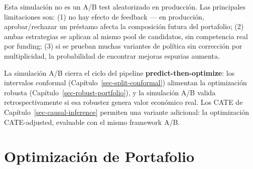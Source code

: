 \documentclass[
  spanish,
  11pt,
  letterpaper,
]{scrbook}
\theoremstyle{plain}
\theoremstyle{remark}
\begin{document}
\begin{tcolorbox}[enhanced jigsaw, arc=.35mm, bottomrule=.15mm, bottomtitle=1mm, breakable, colback=white, colbacktitle=quarto-callout-warning-color!10!white, colframe=quarto-callout-warning-color-frame, coltitle=black, left=2mm, leftrule=.75mm, opacityback=0, opacitybacktitle=0.6, rightrule=.15mm, title=\textcolor{quarto-callout-warning-color}{\faExclamationTriangle}\hspace{0.5em}{Limitaciones del diseño retroactivo}, titlerule=0mm, toprule=.15mm, toptitle=1mm]

Esta simulación no es un A/B test aleatorizado en producción. Las
principales limitaciones son: (1) no hay efecto de feedback --- en
producción, aprobar/rechazar un préstamo afecta la composición futura
del portafolio; (2) ambas estrategias se aplican al mismo pool de
candidatos, sin competencia real por funding; (3) si se prueban muchas
variantes de política sin corrección por multiplicidad, la probabilidad
de encontrar mejoras espurias aumenta.

\end{tcolorbox}

\begin{tcolorbox}[enhanced jigsaw, arc=.35mm, bottomrule=.15mm, bottomtitle=1mm, breakable, colback=white, colbacktitle=quarto-callout-tip-color!10!white, colframe=quarto-callout-tip-color-frame, coltitle=black, left=2mm, leftrule=.75mm, opacityback=0, opacitybacktitle=0.6, rightrule=.15mm, title=\textcolor{quarto-callout-tip-color}{\faLightbulb}\hspace{0.5em}{Conexión con el pipeline}, titlerule=0mm, toprule=.15mm, toptitle=1mm]

La simulación A/B cierra el ciclo del pipeline
\textbf{predict-then-optimize}: los intervalos conformal
(Capítulo~\ref{sec-split-conformal}) alimentan la optimización robusta
(Capítulo~\ref{sec-robust-portfolio}), y la simulación A/B valida
retrospectivamente si esa robustez genera valor económico real. Los CATE
de Capítulo~\ref{sec-causal-inference} permiten una variante adicional:
la optimización CATE-adjusted, evaluable con el mismo framework A/B.

\end{tcolorbox}

\chapter{Optimización de
Portafolio}\label{optimizaciuxf3n-de-portafolio}
\end{document}
